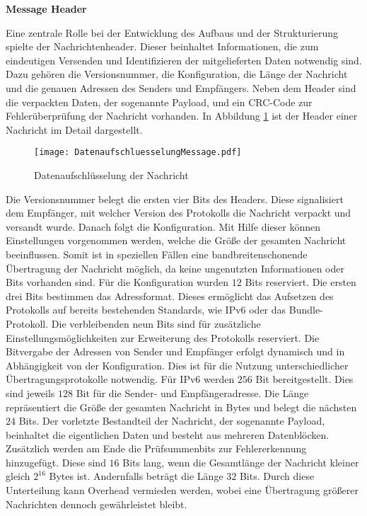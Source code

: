 \label{sec:ProtokolDesign}

\textbf{Message Header}

Eine zentrale Rolle bei der Entwicklung des Aufbaus und der Strukturierung
spielte der Nachrichtenheader.
Dieser beinhaltet Informationen, die zum eindeutigen Versenden und Identifizieren der
mitgelieferten Daten notwendig sind. Dazu gehören die Versionsnummer,
die Konfiguration, die Länge der Nachricht und die genauen Adressen
des Senders und Empfängers. Neben dem Header sind die verpackten Daten, der
sogenannte Payload, und ein CRC-Code zur Fehlerüberprüfung der Nachricht
vorhanden. In Abbildung \ref{fig:DatenaufschluesselungMessage} ist der Header
einer Nachricht im Detail dargestellt.

\begin{figure}[H]
	\centering
	\texttt{[image: DatenaufschluesselungMessage.pdf]}
	\caption{Datenaufschlüsselung der Nachricht}
	\label{fig:DatenaufschluesselungMessage}
\end{figure}

Die Versionsnummer belegt die ersten vier Bits des Headers. Diese
signalisiert dem Empfänger, mit welcher Version des Protokolls die Nachricht
verpackt und versandt wurde. Danach folgt die Konfiguration. Mit Hilfe dieser
können Einstellungen vorgenommen werden, welche die Größe der gesamten Nachricht
beeinflussen. Somit ist in speziellen Fällen eine bandbreitenschonende
Übertragung der Nachricht möglich, da keine ungenutzten Informationen oder Bits
vorhanden sind. Für die Konfiguration wurden $12$ Bits reserviert. Die ersten
drei Bits bestimmen das Adressformat. Dieses ermöglicht das Aufsetzen des
Protokolls auf bereits bestehenden Standards, wie IPv6 oder das Bundle-Protokoll.
Die verbleibenden neun Bits sind für zusätzliche Einstellungsmöglichkeiten zur
Erweiterung des Protokolls reserviert. Die Bitvergabe der Adressen von Sender
und Empfänger erfolgt dynamisch und in Abhängigkeit von der Konfiguration.
Dies ist für die Nutzung unterschiedlicher Übertragungsprotokolle notwendig.
Für IPv6 werden $256$ Bit bereitgestellt. Dies sind jeweils $128$ Bit für
die Sender- und Empfängeradresse. Die Länge repräsentiert die Größe der gesamten
Nachricht in Bytes und belegt die nächsten $24$ Bits.
Der vorletzte Bestandteil der Nachricht, der sogenannte Payload, beinhaltet die
eigentlichen Daten und besteht aus mehreren Datenblöcken. Zusätzlich werden am
Ende die Prüfsummenbits zur Fehlererkennung hinzugefügt. Diese sind $16$ Bits lang,
wenn die Gesamtlänge der Nachricht kleiner gleich $2^{16}$ Bytes ist.
Andernfalls beträgt die Länge $32$ Bits. Durch diese Unterteilung kann
Overhead vermieden werden, wobei eine {\"U}bertragung gr{\"o}{\ss}erer
Nachrichten dennoch gew{\"a}hrleistet bleibt.

